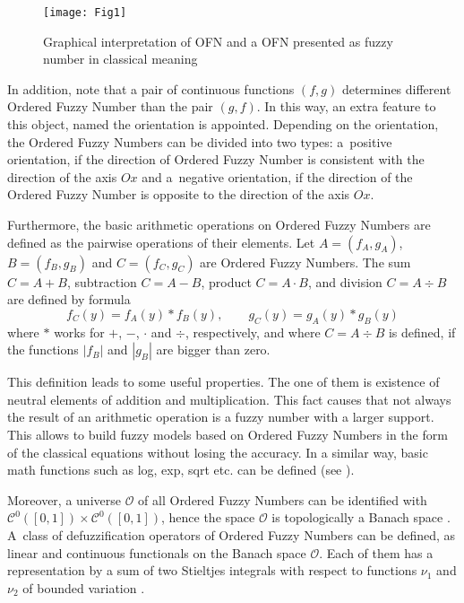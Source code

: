 \documentclass[review]{elsarticle}
\begin{document}
\begin{figure}[!ht]
\centering
\texttt{[image: Fig1]}
\vspace{-25pt}
\caption{Graphical interpretation of OFN and a OFN presented as fuzzy number in classical meaning}
\label{fig:1}
\end{figure}

In addition, note that a pair of continuous functions $(f,g)$ determines different Ordered Fuzzy Number than the pair $(g,f)$. In this way, an extra feature to this object, named the orientation is appointed. Depending on the orientation, the Ordered Fuzzy Numbers can be divided into two types: a~positive orientation, if the direction of Ordered Fuzzy Number is consistent with the direction of the axis $Ox$ and a~negative orientation, if the direction of the Ordered Fuzzy Number is opposite to the direction of the axis $Ox$.

Furthermore, the basic arithmetic operations on Ordered Fuzzy Numbers are defined as the pairwise operations of their elements. Let $A=(f_A,g_A)$, \linebreak $B=(f_B,g_B)$ and $C=(f_C,g_C)$ are Ordered Fuzzy Numbers. The sum \linebreak $C=A+B$, subtraction $C=A-B$, product $C= A\cdot B$, and division $C=A\div B$ are defined by formula
\begin{equation}
f_C(y)=f_A(y)\ast f_B(y),\qquad g_C(y)=g_A(y)\ast g_B(y)
\end{equation}
where $\ast$ works for $+$, $-$, $\cdot$ and $\div$, respectively, and where $C=A\div B$ is defined, if the functions $|f_B|$ and $|g_B|$ are bigger than zero. 

This definition leads to some useful properties. The one of them is existence of neutral elements of addition and multiplication. This fact causes that not always the result of an arithmetic operation is a fuzzy number with a larger support. This allows to build fuzzy models based on Ordered Fuzzy Numbers in the form of the classical equations without losing the accuracy. In a similar way, basic math functions such as log, exp, sqrt etc. can be defined (see \cite{prokopowicz}).

Moreover, a universe $\mathcal{O}$ of all Ordered Fuzzy Numbers can be identified with $\mathcal{C}^0([0,1])\times\mathcal{C}^0([0,1])$, hence the space $\mathcal{O}$ is topologically a Banach space \cite{kos2004}. A~class of defuzzification operators of Ordered Fuzzy Numbers can be defined, as linear and continuous functionals on the Banach space $\mathcal{O}$. Each of them has a representation by a sum of two Stieltjes integrals with respect to functions $\nu_1$ and $\nu_2$ of bounded variation \cite{kos2010}.
\end{document}

